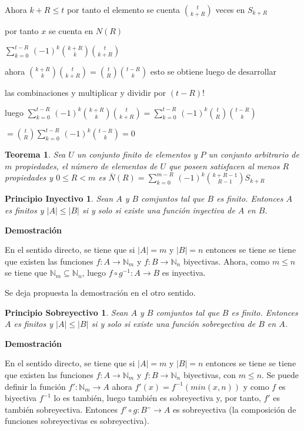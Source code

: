 \documentclass[a4paper,12pt]{report}
\newtheorem*{pin}{Principio Inyectivo}
\newtheorem*{pso}{Principio Sobreyectivo}
\newtheorem*{teo}{Teorema}
\begin{document}
Ahora $k+R\leq t$ por tanto el elemento se cuenta $t\choose{k+R}$ veces en $S_{k+R}$ 

por tanto $x$ se cuenta en $N(R)$
 
$\sum^{t-R}_{k=0}\, (-1)^k$${k+R}\choose{k}$${t}\choose{k+R}$

ahora ${k+R}\choose{k}$${t}\choose{k+R}$$=$${t}\choose{R}$${t-R}\choose{k}$ esto se obtiene luego de desarrollar 

las combinaciones y multiplicar y dividir por $(t-R)!$

luego $\sum^{t-R}_{k=0}\, (-1)^k$${k+R}\choose{k}$${t}\choose{k+R}$$=$$\sum^{t-R}_{k=0}\, (-1)^k$${t}\choose{R}$${t-R}\choose{k}$

$=$${t}\choose{R}$$\sum^{t-R}_{k=0}\, (-1)^k$${t-R}\choose{k}$$=0$

\begin{teo}
  Sea $U$ un conjunto finito de elementos y $P$ un conjunto arbitrario de $m$ propiedades, el número de elementos de $U$ que poseen satisfacen al menos $R$ propiedades y $0\leq R < m$ es
 $\bar{N}(R) = \sum^{m-R}_{k=0}\, (-1)^k$${k+R-1}\choose{R-1}$$S_{k+R}$
\end{teo}

\begin{pin}
 Sean $A$ y $B$ comjuntos tal que $B$ es finito. Entonces $A$ es finitos y $|A|\leq|B|$ si y solo si existe una función inyectiva de $A$ en $B$.
\end{pin}

\textbf{Demostración}

En el sentido directo, se tiene que si $|A|=m$ y $|B|=n$ entonces se tiene se tiene que existen las funciones $f:A\rightarrow\mathbb{N}_m$ y $f:B\rightarrow\mathbb{N}_n$ biyectivas. Ahora, como $m\leq n$ se tiene que $\mathbb{N}_m\subseteq\mathbb{N}_n$, luego $f\circ g^{-1}:A\rightarrow B$ es inyectiva.

Se deja propuesta la demostración en el otro sentido. 

\begin{pso}
 Sean $A$ y $B$ comjuntos tal que $B$ es finito. Entonces $A$ es finitos y $|A|\leq|B|$ si y solo si existe una función sobreyectiva de $B$ en $A$.
\end{pso}

\textbf{Demostración}

En el sentido directo, se tiene que si $|A|=m$ y $|B|=n$ entonces se tiene se tiene que existen las funciones $f:A\rightarrow\mathbb{N}_m$ y $f:B\rightarrow\mathbb{N}_n$ biyectivas, con $m\leq n$. Se puede definir la función $f':\mathbb{N}_m\rightarrow A$ ahora $f'(x)=f^{-1}(min(x,n))$ y como $f$ es biyectiva $f^{-1}$ lo es también, luego también es sobreyectiva y, por tanto, $f'$ es también sobreyectiva. Entonces $f'\circ g:B¨\rightarrow A$ es sobreyectiva (la composición de funciones sobreyectivas es sobreyectiva).
\end{document}
